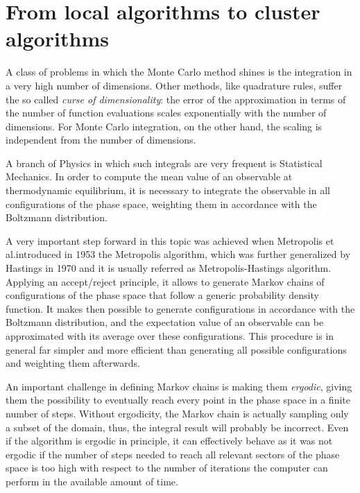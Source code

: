 \section*{From local algorithms to cluster algorithms}
A class of problems in which the Monte Carlo method shines is the integration in a very high number of dimensions.
Other methods, like quadrature rules, suffer the so called \emph{curse of dimensionality}:
the error of the approximation in terms of the number of function evaluations scales exponentially with the number of dimensions.
For Monte Carlo integration, on the other hand, the scaling is independent from the number of dimensions.

A branch of Physics in which such integrals are very frequent is Statistical Mechanics.
In order to compute the mean value of an observable at thermodynamic equilibrium,
it is necessary to integrate the observable in all configurations of the phase space, weighting them in accordance with the Boltzmann distribution.

A very important step forward in this topic was achieved when Metropolis et al.\@ introduced in 1953 \cite{metropolis:1953} the Metropolis algorithm,
which was further generalized by Hastings in 1970 \cite{hastings:1970} and it is usually referred as Metropolis-Hastings algorithm.
Applying an accept/reject principle, it allows to generate Markov chains of configurations of the phase space that follow a generic probability density function.
It makes then possible to generate configurations in accordance with the Boltzmann distribution,
and the expectation value of an observable can be approximated with its average over these configurations.
This procedure is in general far simpler and more efficient than generating all possible configurations and weighting them afterwards.

An important challenge in defining Markov chains is making them \emph{ergodic},
\ie giving them the possibility to eventually reach every point in the phase space in a finite number of steps.
Without ergodicity, the Markov chain is actually sampling only a subset of the domain, thus, the integral result will probably be incorrect.
Even if the algorithm is ergodic in principle,
it can effectively behave as it was not ergodic if the number of steps needed to reach all relevant sectors of the phase space is too high
with respect to the number of iterations the computer can perform in the available amount of time.


